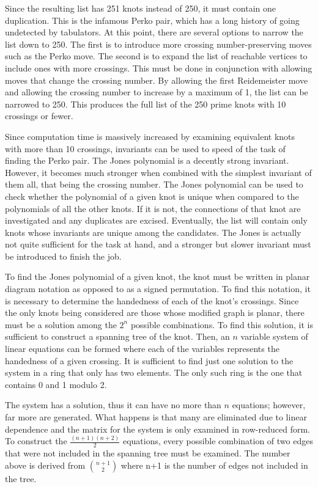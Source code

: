 \begin{paper}
Since the resulting list has 251 knots instead of 250, it must contain one
duplication.
This is the infamous Perko pair, which has a long history of going undetected by
tabulators.
At this point, there are several options to narrow the list down to 250.
The first is to introduce more crossing number-preserving moves such as the
Perko move.
The second is to expand the list of reachable vertices to include ones with more
crossings.
This must be done in conjunction with allowing moves that change the crossing
number.
By allowing the first Reidemeister move and allowing the crossing number to
increase by a maximum of 1, the list can be narrowed to 250.
This produces the full list of the 250 prime knots with 10 crossings or fewer.


Since computation time is massively increased by examining equivalent knots with
more than 10 crossings, invariants can be used to speed of the task of finding
the Perko pair.
The Jones polynomial is a decently strong invariant.
However, it becomes much stronger when combined with the simplest invariant of
them all, that being the crossing number.
The Jones polynomial can be used to check whether the polynomial of a given knot
is unique when compared to the polynomials of all the other knots.
If it is not, the connections of that knot are investigated and any duplicates
are excised.
Eventually, the list will contain only knots whose invariants are unique among
the candidates.
The Jones is actually not quite sufficient for the task at hand, and a stronger
but slower invariant must be introduced to finish the job.


To find the Jones polynomial of a given knot, the knot must be written in planar
diagram notation as opposed to as a signed permutation.
To find this notation, it is necessary to determine the handedness of each of
the knot's crossings.
Since the only knots being considered are those whose modified graph is planar,
there must be a solution among the $2^n$ possible combinations.
To find this solution, it is sufficient to construct a spanning tree of the
knot.
Then, an $n$ variable system of linear equations can be formed where each of the
variables represents the handedness of a given crossing.
It is sufficient to find just one solution to the system in a ring that only has
two elements.
The only such ring is the one that contains 0 and 1 modulo 2.

The system has a solution, thus it can have no more than $n$ equations; however,
far more are generated.
What happens is that many are eliminated due to linear dependence and the matrix
for the system is only examined in row-reduced form.
To construct the $\frac{(n+1)(n+2)}2$ equations, every possible combination of
two edges that were not included in the spanning tree must be examined.
The number above is derived from ${n+1}\choose2$ where n+1 is the number of
edges not included in the tree.


\end{paper}
